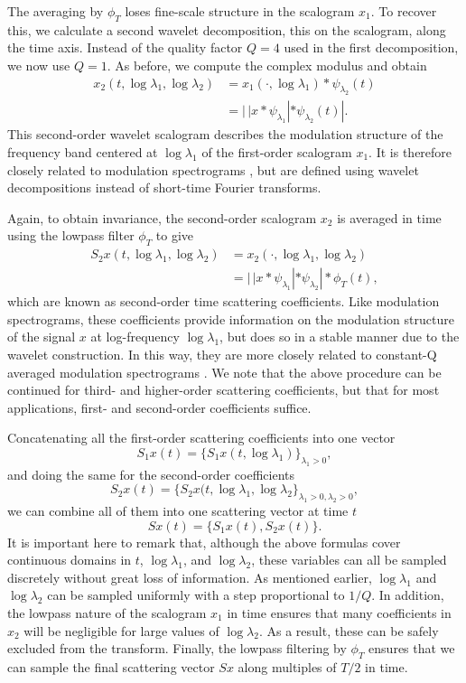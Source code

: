 \documentclass{article}
\newcommand{\lau}{{\lambda_1}}
\newcommand{\lad}{{\lambda_2}}
\begin{document}
\begin{sloppy}
The averaging by $\phi_T$ loses fine-scale structure in the scalogram $x_1$. To recover this, we calculate a second wavelet decomposition, this on the scalogram, along the time axis. Instead of the quality factor $Q = 4$ used in the first decomposition, we now use $Q = 1$. As before, we compute the complex modulus and obtain
\begin{align}
	\nonumber
	x_2(t, \log \lau, \log \lad) &= x_1(\cdot, \log \lau) \ast \psi_\lad(t) \\
	&= |\,| x \ast \psi_\lau | \ast \psi_\lad (t) |.
\end{align}
This second-order wavelet scalogram describes the modulation structure of the frequency band centered at $\log \lau$ of the first-order scalogram $x_1$. It is therefore closely related to modulation spectrograms \cite{atlas}, but are defined using wavelet decompositions instead of short-time Fourier transforms.

Again, to obtain invariance, the second-order scalogram $x_2$ is averaged in time using the lowpass filter $\phi_T$ to give
\begin{align}
	\nonumber
	S_2 x(t, \log \lau, \log \lad) &= x_2(\cdot, \log \lau, \log \lad) \\
	&= |\,| x \ast \psi_\lau | \ast \psi_\lad | \ast \phi_T(t),
\end{align}
which are known as second-order time scattering coefficients. Like modulation spectrograms, these coefficients provide information on the modulation structure of the signal $x$ at log-frequency $\log \lau$, but does so in a stable manner due to the wavelet construction. In this way, they are more closely related to constant-Q averaged modulation spectrograms \cite{ellis-mcdermott}. We note that the above procedure can be continued for third- and higher-order scattering coefficients, but that for most applications, first- and second-order coefficients suffice.

Concatenating all the first-order scattering coefficients into one vector
\begin{equation}
	S_1x(t) = \{S_1x(t, \log \lau)\}_{\lau>0},
\end{equation}
and doing the same for the second-order coefficients
\begin{equation}
	S_2x(t) = \{S_2x(t, \log \lau, \log \lad\}_{\lau>0, \lad>0},
\end{equation}
we can combine all of them into one scattering vector at time $t$
\begin{equation}
	Sx(t) = \{S_1x(t), S_2x(t)\}.
\end{equation}
It is important here to remark that, although the above formulas cover continuous domains in $t$, $\log \lau$, and $\log \lad$, these variables can all be sampled discretely without great loss of information. As mentioned earlier, $\log \lau$ and $\log \lad$ can be sampled uniformly with a step proportional to $1/Q$. In addition, the lowpass nature of the scalogram $x_1$ in time ensures that many coefficients in $x_2$ will be negligible for large values of $\log \lad$. As a result, these can be safely excluded from the transform. Finally, the lowpass filtering by $\phi_T$ ensures that we can sample the final scattering vector $Sx$ along multiples of $T/2$ in time.


\end{sloppy}
\end{document}
